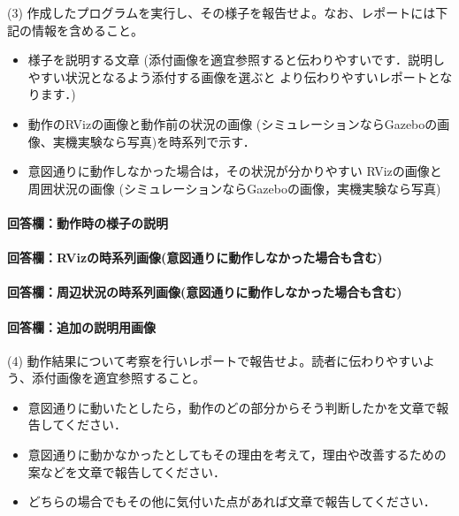 \documentclass[12pt, xelatex,ja=standard,jafont=noto]{bxjsarticle}
\newif\ifdraft
\begin{document}
\begin{itembox}[l]{(3)}
作成したプログラムを実行し、その様子を報告せよ。なお、レポートには下記の情報を含めること。
\begin{itemize}
    \item 様子を説明する文章 (添付画像を適宜参照すると伝わりやすいです．説明しやすい状況となるよう添付する画像を選ぶと より伝わりやすいレポートとなります．)
    \item 動作のRVizの画像と動作前の状況の画像 (シミュレーションならGazeboの画像、実機実験なら写真)を時系列で示す．
    \item 意図通りに動作しなかった場合は，その状況が分かりやすい RVizの画像と周囲状況の画像 (シミュレーションならGazeboの画像，実機実験なら写真)
\end{itemize}
\end{itembox}

\paragraph{回答欄：動作時の様子の説明}
\ifdraft
動作時の様子を説明する文章を記載する．図、写真などをふんだんにとりいれること。
\fi

\paragraph{回答欄：RVizの時系列画像(意図通りに動作しなかった場合も含む)}
\ifdraft
RVizの時系列画像を貼り付ける
\fi

\paragraph{回答欄：周辺状況の時系列画像(意図通りに動作しなかった場合も含む)}
\ifdraft
周辺状況の時系列画像を貼り付ける
\fi

\paragraph{回答欄：追加の説明用画像}
\ifdraft
説明に必要な追加画像があれば貼り付ける
\fi

\begin{itembox}[l]{(4)}
動作結果について考察を行いレポートで報告せよ。読者に伝わりやすいよう、添付画像を適宜参照すること。
\begin{itemize}
    \item 意図通りに動いたとしたら，動作のどの部分からそう判断したかを文章で報告してください．
    \item 意図通りに動かなかったとしてもその理由を考えて，理由や改善するための案などを文章で報告してください．
    \item どちらの場合でもその他に気付いた点があれば文章で報告してください．
\end{itemize}
\end{itembox}
\end{document}
